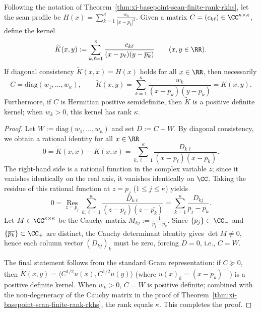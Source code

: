 \begin{proposition}\label{prop:xi-basepoint-scan-kernel-uniqueness}
Following the notation of Theorem~\ref{thm:xi-basepoint-scan-finite-rank-rkhs}, let the scan profile be
\(
H(x)=\sum_{k=1}^{\kappa}\frac{w_k}{|x-p_k|^2}
\).
Given a matrix \(C=(c_{k\ell})\in\CC^{\kappa\times\kappa}\), define the kernel
\[
\widetilde K(x,y):=\sum_{k,\ell=1}^{\kappa}\frac{c_{k\ell}}{(x-p_\ell)(y-\overline{p_k})}\qquad(x,y\in\RR).
\]
If diagonal consistency \(\widetilde K(x,x)=H(x)\) holds for all \(x\in\RR\), then necessarily
\[
C=\mathrm{diag}(w_1,\dots,w_\kappa),
\qquad
\widetilde K(x,y)=\sum_{k=1}^{\kappa}\frac{w_k}{(x-p_k)(y-\overline{p_k})}=K(x,y).
\]
Furthermore, if \(C\) is Hermitian positive semidefinite, then \(\widetilde K\) is a positive definite kernel; when \(w_k>0\), this kernel has rank \(\kappa\).
\end{proposition}
\begin{proof}
Let \(W:=\mathrm{diag}(w_1,\dots,w_\kappa)\) and set \(D:=C-W\).
By diagonal consistency, we obtain a rational identity for all \(x\in\RR\)
\[
0=\widetilde K(x,x)-K(x,x)
=\sum_{k,\ell=1}^{\kappa}\frac{D_{k\ell}}{(x-p_\ell)(x-\overline{p_k})}.
\]
The right-hand side is a rational function in the complex variable \(z\); since it vanishes identically on the real axis, it vanishes identically on \(\CC\).
Taking the residue of this rational function at \(z=p_j\) (\(1\le j\le \kappa\)) yields
\[
0=\operatorname*{Res}_{z=p_j}\sum_{k,\ell=1}^{\kappa}\frac{D_{k\ell}}{(z-p_\ell)(z-\overline{p_k})}
=\sum_{k=1}^{\kappa}\frac{D_{kj}}{p_j-\overline{p_k}}.
\]
Let \(M\in\CC^{\kappa\times\kappa}\) be the Cauchy matrix \(M_{kj}:=\frac{1}{p_j-\overline{p_k}}\).
Since \(\{p_j\}\subset\CC_{-}\) and \(\{\overline{p_k}\}\subset\CC_{+}\) are distinct, the Cauchy determinant identity gives \(\det M\ne 0\), hence each column vector \((D_{kj})_{k}\) must be zero, forcing \(D=0\), i.e., \(C=W\).
\par
The final statement follows from the standard Gram representation: if \(C\succeq 0\), then \(\widetilde K(x,y)=\langle C^{1/2}u(x),C^{1/2}u(y)\rangle\) (where \(u(x)_k=(x-p_k)^{-1}\)) is a positive definite kernel.
When \(w_k>0\), \(C=W\) is positive definite; combined with the non-degeneracy of the Cauchy matrix in the proof of Theorem~\ref{thm:xi-basepoint-scan-finite-rank-rkhs}, the rank equals \(\kappa\). This completes the proof.
\end{proof}

